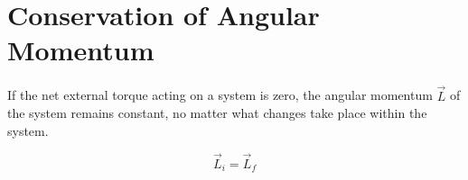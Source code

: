 \documentclass{article}
\begin{document}
    \section{Conservation of Angular Momentum}

        If the net external torque acting on a system is zero, the angular momentum $\vec{L}$ of the system remains constant, no matter what changes take place within the system.

        \begin{equation}
            \vec{L}_i = \vec{L}_f
        \end{equation}
\end{document}
